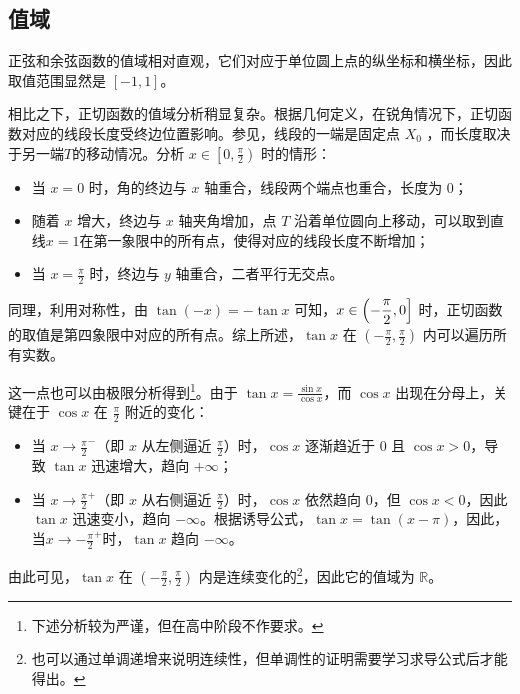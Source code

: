 \subsection{值域}

正弦和余弦函数的值域相对直观，它们对应于单位圆上点的纵坐标和横坐标，因此取值范围显然是 $[-1,1]$。

相比之下，正切函数的值域分析稍显复杂。根据几何定义，在锐角情况下，正切函数对应的线段长度受终边位置影响。参见，线段的一端是固定点 $X_0$ ，而长度取决于另一端$T$的移动情况。分析 $\displaystyle x\in\left[0,\frac{\pi}{2}\right)$ 时的情形：
\begin{itemize}
\item 当 $x=0$ 时，角的终边与 $x$ 轴重合，线段两个端点也重合，长度为 $0$；
\item 随着 $x$ 增大，终边与 $x$ 轴夹角增加，点 $T$ 沿着单位圆向上移动，可以取到直线$x=1$在第一象限中的所有点，使得对应的线段长度不断增加；
\item 当 $x=\frac{\pi}{2}$ 时，终边与 $y$ 轴重合，二者平行无交点。
\end{itemize}
同理，利用对称性，由 $\tan(-x) = -\tan x$ 可知，$\displaystyle x\in\left(-{\pi\over2},0\right]$ 时，正切函数的取值是第四象限中对应的所有点。综上所述，$\tan x$ 在 $\displaystyle \left(-\frac{\pi}{2},\frac{\pi}{2}\right)$ 内可以遍历所有实数。

这一点也可以由极限分析得到\footnote{下述分析较为严谨，但在高中阶段不作要求。}。由于 $\displaystyle\tan x = \frac{\sin x}{\cos x}$，而 $\cos x$ 出现在分母上，关键在于 $\cos x$ 在 $\displaystyle\frac{\pi}{2}$ 附近的变化：
\begin{itemize}
\item 当 $\displaystyle x \to \frac{\pi}{2}^-$（即 $x$ 从左侧逼近 $\frac{\pi}{2}$）时，$\cos x$ 逐渐趋近于 $0$ 且 $\cos x > 0$，导致 $\tan x$ 迅速增大，趋向 $+\infty$；
\item 当 $\displaystyle x \to \frac{\pi}{2}^+$（即 $x$ 从右侧逼近 $\frac{\pi}{2}$）时，$\cos x$ 依然趋向 $0$，但 $\cos x < 0$，因此 $\tan x$ 迅速变小，趋向 $-\infty$。根据诱导公式，$\tan x=\tan(x-\pi)$，因此，当$\displaystyle x \to -\frac{\pi}{2}^+$时，$\tan x$ 趋向 $-\infty$。
\end{itemize}

由此可见，$\tan x$ 在 $\displaystyle (-\frac{\pi}{2},\frac{\pi}{2})$ 内是连续变化的\footnote{也可以通过单调递增来说明连续性，但单调性的证明需要学习求导公式后才能得出。}，因此它的值域为 $\mathbb{R}$。


